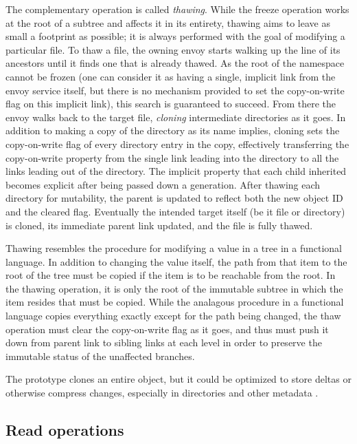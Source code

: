 The complementary operation is called \emph{thawing}. While the freeze operation works at the root of a subtree and affects it in its entirety, thawing aims to leave as small a footprint as possible; it is always performed with the goal of modifying a particular file. To thaw a file, the owning envoy starts walking up the line of its ancestors until it finds one that is already thawed. As the root of the namespace cannot be frozen (one can consider it as having a single, implicit link from the envoy service itself, but there is no mechanism provided to set the copy-on-write flag on this implicit link), this search is guaranteed to succeed. From there the envoy walks back to the target file, \emph{cloning} intermediate directories as it goes. In addition to making a copy of the directory as its name implies, cloning sets the copy-on-write flag of every directory entry in the copy, effectively transferring the copy-on-write property from the single link leading into the directory to all the links leading out of the directory. The implicit property that each child inherited becomes explicit after being passed down a generation. After thawing each directory for mutability, the parent is updated to reflect both the new object ID and the cleared flag. Eventually the intended target itself (be it file or directory) is cloned, its immediate parent link updated, and the file is fully thawed.

Thawing resembles the procedure for modifying a value in a tree in a functional language. In addition to changing the value itself, the path from that item to the root of the tree must be copied if the item is to be reachable from the root. In the thawing operation, it is only the root of the immutable subtree in which the item resides that must be copied. While the analagous procedure in a functional language copies everything exactly except for the path being changed, the thaw operation must clear the copy-on-write flag as it goes, and thus must push it down from parent link to sibling links at each level in order to preserve the immutable status of the unaffected branches.

The prototype clones an entire object, but it could be optimized to store deltas or otherwise compress changes, especially in directories and other metadata \cite{soules}.

\subsection{Read operations}

